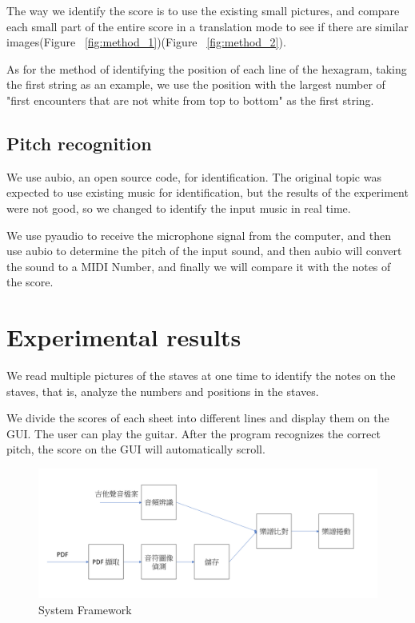 \documentclass[10pt,twocolumn,letterpaper]{article}
\begin{document}
\begin{CJK}{UTF8}{bsmi}
The way we identify the score is to use the existing small pictures, and compare each small part of the entire score in a translation mode to see if there are similar images(Figure ~\ref{fig:method_1})(Figure ~\ref{fig:method_2}).

As for the method of identifying the position of each line of the hexagram, taking the first string as an example, we use the position with the largest number of "first encounters that are not white from top to bottom" as the first string.

\subsection{Pitch recognition}

We use aubio, an open source code, for identification. The original topic was expected to use existing music for identification, but the results of the experiment were not good, so we changed to identify the input music in real time.

We use pyaudio to receive the microphone signal from the computer, and then use aubio to determine the pitch of the input sound, and then aubio will convert the sound to a MIDI Number, and finally we will compare it with the notes of the score.

\section{Experimental results}


We read multiple pictures of the staves at one time to identify the notes on the staves, that is, analyze the numbers and positions in the staves.

We divide the scores of each sheet into different lines and display them on the GUI. The user can play the guitar. After the program recognizes the correct pitch, the score on the GUI will automatically scroll.

\begin{figure}[t]
\begin{center}
   \includegraphics[width=0.8\linewidth]{system_framework.png}
\end{center}
   \caption{System Framework}
\label{fig:long}
\label{fig:system_framework}
\end{figure}


\end{CJK}
\end{document}
